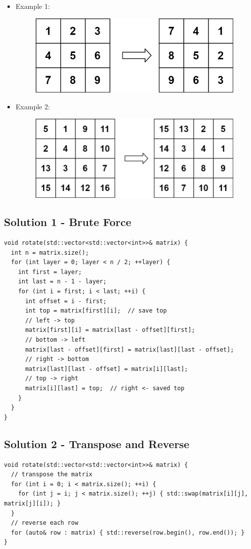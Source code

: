 \begin{itemize}
\item Example 1:
\begin{figure}[H]
\centering
\includegraphics[width=0.4\linewidth]{images/lc0048_eg1}
\end{figure}
\item Example 2:
\begin{figure}[H]
\centering
\includegraphics[width=0.5\linewidth]{images/lc0048_eg2}
\end{figure}
\end{itemize}

\subsection*{Solution 1 - Brute Force}
\begin{lstlisting}
void rotate(std::vector<std::vector<int>>& matrix) {
  int n = matrix.size();
  for (int layer = 0; layer < n / 2; ++layer) {
    int first = layer;
    int last = n - 1 - layer;
    for (int i = first; i < last; ++i) {
      int offset = i - first;
      int top = matrix[first][i];  // save top
      // left -> top
      matrix[first][i] = matrix[last - offset][first];
      // bottom -> left
      matrix[last - offset][first] = matrix[last][last - offset];
      // right -> bottom
      matrix[last][last - offset] = matrix[i][last];
      // top -> right
      matrix[i][last] = top;  // right <- saved top
    }
  }
}
\end{lstlisting}

\subsection*{Solution 2 - Transpose and Reverse}
\begin{lstlisting}
void rotate(std::vector<std::vector<int>>& matrix) {
  // transpose the matrix
  for (int i = 0; i < matrix.size(); ++i) {
    for (int j = i; j < matrix.size(); ++j) { std::swap(matrix[i][j], matrix[j][i]); }
  }
  // reverse each row
  for (auto& row : matrix) { std::reverse(row.begin(), row.end()); }
}
\end{lstlisting}